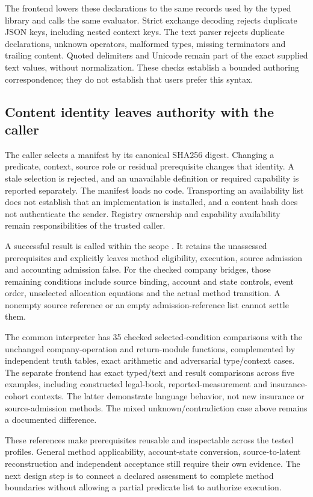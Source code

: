 The frontend lowers these declarations to the same records used by the typed
library and calls the same evaluator. Strict exchange decoding rejects duplicate
JSON keys, including nested context keys. The text parser rejects duplicate
declarations, unknown operators, malformed types, missing terminators and
trailing content. Quoted delimiters and Unicode remain part of the exact supplied
text values, without normalization. These checks establish a bounded authoring
correspondence; they do not establish that users prefer this syntax.

\subsection{Content identity leaves authority with the caller}

The caller selects a manifest by its canonical SHA256 digest. Changing a
predicate, context, source role or residual prerequisite changes that identity.
A stale selection is rejected, and an unavailable definition or required
capability is reported separately. The manifest loads no code. Transporting an
availability list does not establish that an implementation is installed, and
a content hash does not authenticate the sender. Registry ownership and
capability availability remain responsibilities of the trusted caller.

A successful result is called  within the scope
. It retains the unassessed prerequisites
and explicitly leaves method eligibility, execution, source admission and
accounting admission false. For the checked company bridges, those remaining
conditions include source binding, account and state controls, event order,
unselected allocation equations and the actual method transition. A nonempty
source reference or an empty admission-reference list cannot settle them.

The common interpreter has 35 checked selected-condition comparisons with the
unchanged company-operation and return-module functions, complemented by
independent truth tables, exact arithmetic and adversarial type/context cases.
The separate frontend has exact typed/text and result comparisons across five
examples, including constructed legal-book, reported-measurement and
insurance-cohort contexts. The latter demonstrate language behavior, not new
insurance or source-admission methods. The mixed unknown/contradiction case
above remains a documented difference.

These references make prerequisites reusable and inspectable across the tested
profiles. General method applicability, account-state conversion, source-to-latent
reconstruction and independent acceptance still require their own evidence.
The next design step is to connect a declared assessment to complete method
boundaries without allowing a partial predicate list to authorize execution.

